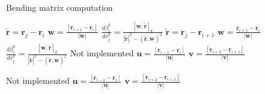 \begin{algorithm}
    \caption{Bending matrix computation}
    \label{alg:BendingAlgorithm}
    \begin{algorithmic}
                    \STATE $\mathbf{\widetilde{r}} = \mathbf{r}_j - \mathbf{r}_{i}$
                    \STATE $\mathbf{w} = \frac{[\mathbf{r}_{i+1} - \mathbf{r}_{i}]}{|\mathbf{w}|}$
                    \STATE $\frac{d\beta_i^k}{dr^k_j} = \frac{[\mathbf{w},\mathbf{\widetilde{r}}]_k}{|\mathbf{\widetilde{r}}|^2 - (\mathbf{\widetilde{r}},\mathbf{w})^2}$
                    \STATE $\mathbf{\widetilde{r}} = \mathbf{r}_j - \mathbf{r}_{i+1}$
                    \STATE $\mathbf{w} = \frac{\mathbf{r}_{i+1} - \mathbf{r}_{i}}{|\mathbf{w}|}$
                    \STATE $\frac{d\beta_i^k}{dr^k_j} = \frac{[\mathbf{w},\mathbf{\widetilde{r}}]_k}{|\mathbf{\widetilde{r}}|^2 - (\mathbf{\widetilde{r}},\mathbf{w})^2}$
                    \STATE Not implemented
                    \STATE $\mathbf{u} = \frac{[\mathbf{r}_{i-1} - \mathbf{r}_{i}]}{|\mathbf{u}|}$
                    \STATE $\mathbf{v} = \frac{[\mathbf{r}_{i+2} - \mathbf{r}_{i+1}]}{|\mathbf{v}|}$
                    
                    \STATE Not implemented
                    \STATE $\mathbf{u} = \frac{[\mathbf{r}_{i-1} - \mathbf{r}_{i}]}{|\mathbf{u}|}$
                    \STATE $\mathbf{v} = \frac{[\mathbf{r}_{i+2} - \mathbf{r}_{i+1}]}{|\mathbf{v}|}$
                    
                \ENDIF               
            \ENDFOR
        \ENDFOR
    \end{algorithmic}
\end{algorithm}
